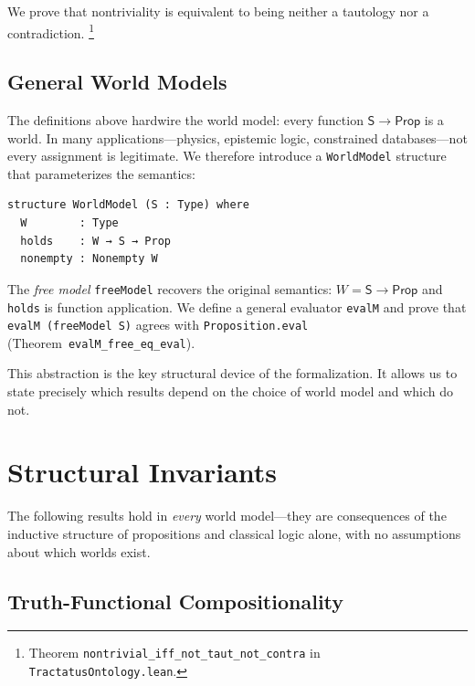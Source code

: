 \documentclass[10pt, letterpaper]{article}
\theoremstyle{definition}
\theoremstyle{remark}
\newcommand{\Sach}{\mathsf{S}}
\newcommand{\Prop}{\mathsf{Prop}}
\begin{document}
\noindent
We prove that nontriviality is equivalent to being neither a
tautology nor a contradiction.%
\footnote{Theorem \texttt{nontrivial\_iff\_not\_taut\_not\_contra}
  in \texttt{TractatusOntology.lean}.}

\subsection{General World Models}
\label{sec:worldmodel}

The definitions above hardwire the world model: every
function $\Sach \to \Prop$ is a world.  In many
applications---physics, epistemic logic, constrained
databases---not every assignment is legitimate.
We therefore introduce a \texttt{WorldModel} structure
that parameterizes the semantics:

\begin{lstlisting}
structure WorldModel (S : Type) where
  W        : Type
  holds    : W → S → Prop
  nonempty : Nonempty W
\end{lstlisting}

\noindent
The \emph{free model} \texttt{freeModel} recovers the original
semantics: $W = \Sach \to \Prop$ and \texttt{holds} is function
application.  We define a general evaluator \texttt{evalM} and
prove that \texttt{evalM (freeModel S)} agrees with
\texttt{Proposition.eval} (Theorem~\texttt{evalM\_free\_eq\_eval}).

This abstraction is the key structural device of the
formalization.  It allows us to state precisely which results
depend on the choice of world model and which do not.

\section{Structural Invariants}
\label{sec:invariants}

The following results hold in \emph{every} world model---they
are consequences of the inductive structure of propositions and
classical logic alone, with no assumptions about which worlds
exist.

\subsection{Truth-Functional Compositionality}
\label{sec:compositionality}
\end{document}
